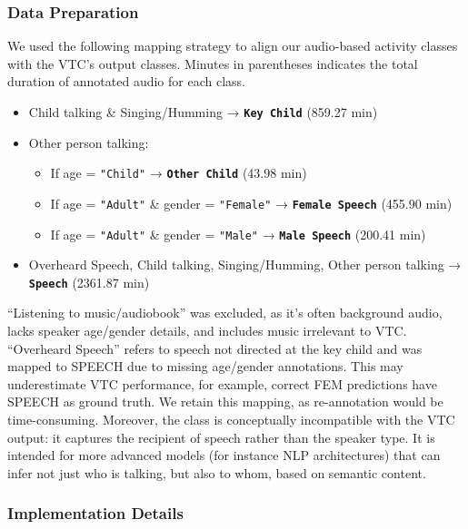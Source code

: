 \documentclass[
  man,floatsintext]{apa6}
\providecommand{\tightlist}{%
  \setlength{\itemsep}{0pt}\setlength{\parskip}{0pt}}
\begin{document}
\subsubsection{Data Preparation}\label{data-preparation-1}

We used the following mapping strategy to align our audio-based activity classes with the VTC's output classes. Minutes in parentheses indicates the total duration of annotated audio for each class.

\begin{itemize}
\tightlist
\item
  Child talking \& Singing/Humming → \textbf{\texttt{Key\ Child}} (859.27 min)
\item
  Other person talking:

  \begin{itemize}
  \tightlist
  \item
    If age = \texttt{"Child"} → \textbf{\texttt{Other\ Child}} (43.98 min)
  \item
    If age = \texttt{"Adult"} \& gender = \texttt{"Female"} → \textbf{\texttt{Female\ Speech}} (455.90 min)
  \item
    If age = \texttt{"Adult"} \& gender = \texttt{"Male"} → \textbf{\texttt{Male\ Speech}} (200.41 min)
  \end{itemize}
\item
  Overheard Speech, Child talking, Singing/Humming, Other person talking → \textbf{\texttt{Speech}} (2361.87 min)
\end{itemize}

``Listening to music/audiobook'' was excluded, as it's often background audio, lacks speaker age/gender details, and includes music irrelevant to VTC. ``Overheard Speech'' refers to speech not directed at the key child and was mapped to SPEECH due to missing age/gender annotations. This may underestimate VTC performance, for example, correct FEM predictions have SPEECH as ground truth. We retain this mapping, as re-annotation would be time-consuming. Moreover, the class is conceptually incompatible with the VTC output: it captures the recipient of speech rather than the speaker type. It is intended for more advanced models (for instance NLP architectures) that can infer not just who is talking, but also to whom, based on semantic content.

\subsubsection{Implementation Details}\label{implementation-details-1}
\end{document}

